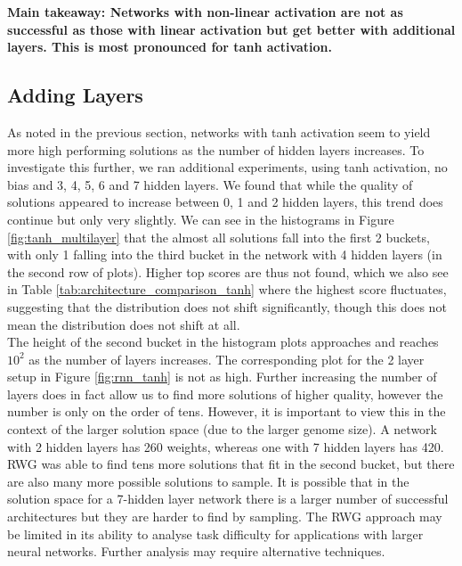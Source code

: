\documentclass[12pt]{article}
\begin{document}
\textbf{Main takeaway: Networks with non-linear activation are not as successful as those with linear activation but get better with additional layers. 
This is most pronounced for tanh activation. }

\subsection{Adding Layers} \label{tanh_multilayer}

As noted in the previous section, networks with tanh activation seem to yield more high performing solutions as the number of hidden layers increases. 
To investigate this further, we ran additional experiments, using tanh activation, no bias and 3, 4, 5, 6 and 7 hidden layers.
We found that while the quality of solutions appeared to increase between 0, 1 and 2 hidden layers, this trend does continue but only very slightly.
We can see in the histograms in Figure \ref{fig:tanh_multilayer} that the almost all solutions fall into the first 2 buckets, with only 1 falling into the third bucket in the network with 4 hidden layers (in the second row of plots). 
Higher top scores are thus not found, which we also see in Table \ref{tab:architecture_comparison_tanh} where the highest score fluctuates, suggesting that the distribution does not shift significantly, though this does not mean the distribution does not shift at all.\\

The height of the second bucket in the histogram plots approaches and reaches $10^2$ as the number of layers increases.
The corresponding plot for the 2 layer setup in Figure \ref{fig:rnn_tanh} is not as high.
Further increasing the number of layers does in fact allow us to find more solutions of higher quality, however the number is only on the order of tens.
However, it is important to view this in the context of the larger solution space (due to the larger genome size).
A network with 2 hidden layers has 260 weights, whereas one with 7 hidden layers has 420.
RWG was able to find tens more solutions that fit in the second bucket, but there are also many more possible solutions to sample. 
It is possible that in the solution space for a 7-hidden layer network there is a larger number of successful architectures but they are harder to find by sampling. 
The RWG approach may be limited in its ability to analyse task difficulty for applications with larger neural networks.
Further analysis may require alternative techniques.\\
\end{document}
